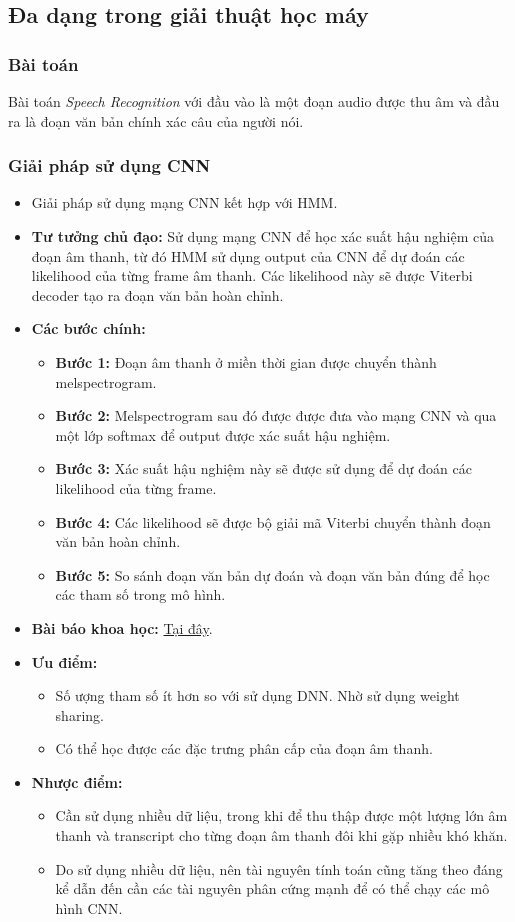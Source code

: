 \subsection{Đa dạng trong giải thuật học máy}
\subsubsection{Bài toán}
Bài toán \textit{Speech Recognition} với đầu vào là một đoạn audio được thu âm và đầu ra là đoạn văn bản chính xác câu của người nói.
\subsubsection{Giải pháp sử dụng CNN}
\begin{itemize}
	\item Giải pháp sử dụng mạng CNN kết hợp với HMM.
	\item \textbf{Tư tưởng chủ đạo: } Sử dụng mạng CNN để học xác suất hậu nghiệm của đoạn âm thanh, từ đó HMM sử dụng output của CNN để dự đoán các likelihood của từng frame âm thanh. Các likelihood này sẽ được Viterbi decoder tạo ra đoạn văn bản hoàn chỉnh.
	\item \textbf{Các bước chính: }
	\begin{itemize}
		\item \textbf{Bước 1: }Đoạn âm thanh ở miền thời gian được chuyển thành melspectrogram. 
		\item \textbf{Bước 2: }Melspectrogram sau đó được được đưa vào mạng CNN và qua một lớp softmax để output được xác suất hậu nghiệm.
		\item \textbf{Bước 3: }Xác suất hậu nghiệm này sẽ được sử dụng để dự đoán các likelihood của từng frame.
		\item \textbf{Bước 4: }Các likelihood sẽ được bộ giải mã Viterbi chuyển thành đoạn văn bản hoàn chỉnh.
		\item \textbf{Bước 5: }So sánh đoạn văn bản dự đoán và đoạn văn bản đúng để học các tham số trong mô hình.
	\end{itemize}
	\item \textbf{Bài báo khoa học: }
	\href{https://www.microsoft.com/en-us/research/wp-content/uploads/2016/02/CNN_ASLPTrans2-14.pdf}{Tại đây}.
	\item \textbf{Ưu điểm: } 
	\begin{itemize}
		\item Số ượng tham số ít hơn so với sử dụng DNN. Nhờ sử dụng weight sharing.
		\item Có thể học được các đặc trưng phân cấp của đoạn âm thanh.
	\end{itemize}
	\item \textbf{Nhược điểm: }
	\begin{itemize}
		\item Cần sử dụng nhiều dữ liệu, trong khi để thu thập được một lượng lớn âm thanh và transcript cho từng đoạn âm thanh đôi khi gặp nhiều khó khăn.
		\item Do sử dụng nhiều dữ liệu, nên tài nguyên tính toán cũng tăng theo đáng kể dẫn đến cần các tài nguyên phân cứng mạnh để có thể chạy các mô hình CNN. 
	\end{itemize}
\end{itemize}
